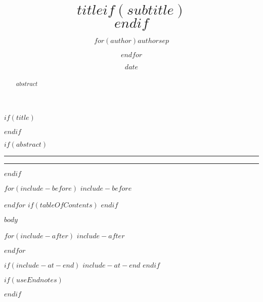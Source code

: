 \documentclass[$if(fontSize)$$fontSize$, $endif$$if(language)$$language$,$else$english,$endif$$if(paperSize)$$paperSize$,$else$ a4paper,$endif$$if(classOptions)$$classOptions$,$endif$$if(twoSided)$twosided,$endif$$if(titlepage)$titlepage$endif$]{$if(documentClass)$$documentClass$$else$article$endif$}
\title{$title$$if(subtitle)$\\\vspace{-0.5em}{\large $subtitle$}$endif$}
\author{$for(author)$$author$$sep$ \and $endfor$}
\date{$date$}
\begin{document}
$if(title)$
	\maketitle
$endif$

$if(abstract)$
\renewcommand\abstractname{Abstract.}
\begin{center}
	\rule[-2em]{0.835\linewidth}{0.05em}
\end{center}

	\begin{abstract}
		$abstract$
	\end{abstract}

\begin{center}
	\rule[1.5em]{0.835\linewidth}{0.05em}
\end{center}
$endif$

$for(include-before)$
$include-before$

$endfor$
$if(tableOfContents)$
{
\hypersetup{linkcolor=black}
\setcounter{tocdepth}{$toc-depth$}
\tableofcontents
}
$endif$

$body$

$for(include-after)$
$include-after$

$endfor$

$if(include-at-end)$
$include-at-end$
$endif$

$if(useEndnotes)$
\renewcommand{\notesname}{~}



\def\enotesize{\normalsize}
\theendnotes
$endif$
\end{document}
